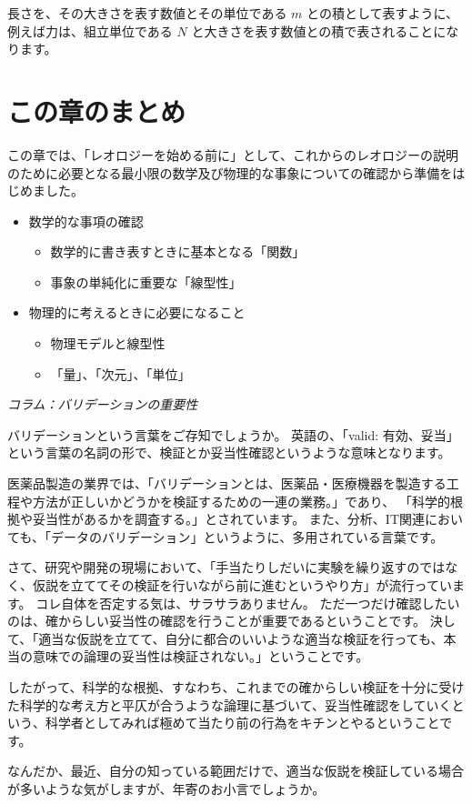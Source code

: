 \documentclass[uplatex,dvipdfmx,a4paper,11pt]{jsreport}
\begin{document}
長さを、その大きさを表す数値とその単位である $m$ との積として表すように、例えば力は、組立単位である $N$ と大きさを表す数値との積で表されることになります。

\section*{この章のまとめ}

この章では、「レオロジーを始める前に」として、これからのレオロジーの説明のために必要となる最小限の数学及び物理的な事象についての確認から準備をはじめました。
\begin{boxnote}
	\large
	\begin{itemize}
		\item 数学的な事項の確認
		\begin{itemize}
			\item 数学的に書き表すときに基本となる「関数」
			\item 事象の単純化に重要な「線型性」
		\end{itemize}
		\item 物理的に考えるときに必要になること
		\begin{itemize}
			\item 物理モデルと線型性
			\item 「量」、「次元」、「単位」
		\end{itemize}
	\end{itemize} 
\end{boxnote}

\newpage

\begin{longartdeco}
	\begin{center}
	\emph{コラム：バリデーションの重要性}	
	\end{center}

	バリデーションという言葉をご存知でしょうか。
	英語の、「valid: 有効、妥当」という言葉の名詞の形で、検証とか妥当性確認というような意味となります。
	
	医薬品製造の業界では、「バリデーションとは、医薬品・医療機器を製造する工程や方法が正しいかどうかを検証するための一連の業務。」であり、
	「科学的根拠や妥当性があるかを調査する。」とされています。
	また、分析、IT関連においても、「データのバリデーション」というように、多用されている言葉です。
	
	さて、研究や開発の現場において、「手当たりしだいに実験を繰り返すのではなく、仮説を立ててその検証を行いながら前に進むというやり方」が流行っています。
	コレ自体を否定する気は、サラサラありません。
	ただ一つだけ確認したいのは、確からしい妥当性の確認を行うことが重要であるということです。
	決して、「適当な仮説を立てて、自分に都合のいいような適当な検証を行っても、本当の意味での論理の妥当性は検証されない。」ということです。
	
	したがって、科学的な根拠、すなわち、これまでの確からしい検証を十分に受けた科学的な考え方と平仄が合うような論理に基づいて、妥当性確認をしていくという、科学者としてみれば極めて当たり前の行為をキチンとやるということです。
	
	なんだか、最近、自分の知っている範囲だけで、適当な仮説を検証している場合が多いような気がしますが、年寄のお小言でしょうか。

\end{longartdeco}
\end{document}
